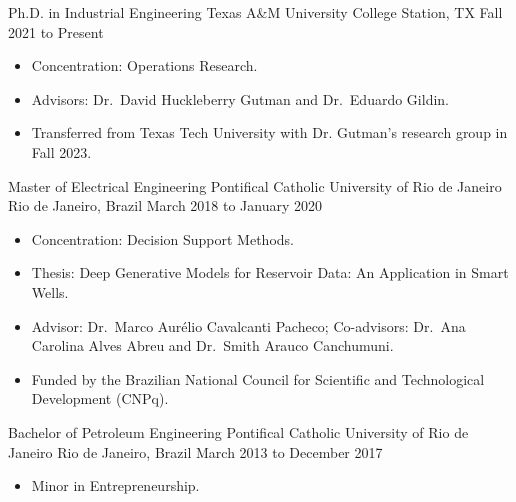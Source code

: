 
\cvjob
    {Ph.D. in Industrial Engineering}
    {Texas A\&M University}
    {College Station, TX}
    {Fall 2021 to Present}

\begin{itemize}
    \item Concentration: Operations Research.
    \item Advisors: Dr.\ David Huckleberry Gutman and Dr.\ Eduardo Gildin.
    \item Transferred from Texas Tech University with Dr. Gutman's research group in Fall 2023.
\end{itemize}

\cvjob
    {Master of Electrical Engineering}
    {Pontifical Catholic University of Rio de Janeiro}
    {Rio de Janeiro, Brazil}
    {March 2018 to January 2020}

\begin{itemize}
    \item Concentration: Decision Support Methods.
    \item Thesis: Deep Generative Models for Reservoir Data: An Application in Smart Wells.
    \item Advisor: Dr.\ Marco Aurélio Cavalcanti Pacheco;
    Co-advisors: Dr.\ Ana Carolina Alves Abreu and Dr.\ Smith Arauco Canchumuni.
    \item Funded by the Brazilian National Council for Scientific and Technological Development (CNPq).
\end{itemize}

\cvjob
    {Bachelor of Petroleum Engineering}
    {Pontifical Catholic University of Rio de Janeiro}
    {Rio de Janeiro, Brazil}
    {March 2013 to December 2017}

\begin{itemize}
    \item Minor in Entrepreneurship.
\end{itemize}
